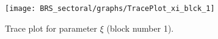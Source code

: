 \begin{figure}[H]
\centering
  \texttt{[image: BRS\_sectoral/graphs/TracePlot\_xi\_blck\_1]}\\
    \caption{Trace plot for parameter $\xi$ (block number 1).}
\end{figure}
